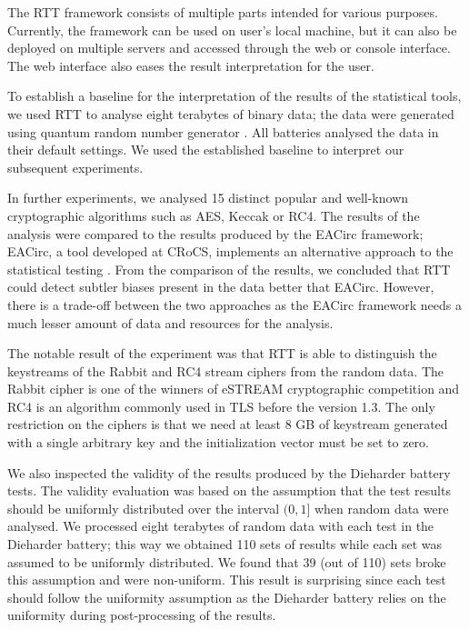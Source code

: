 \documentclass[
	digital,    %
	oneside,
	color,
	11pt,
	nocover,
	notable,
	nolof,
	nolot,
]{fithesis3}
\theoremstyle{definition}
\theoremstyle{remark}
\begin{document}
The RTT framework consists of multiple parts intended for various purposes. Currently, the framework can be used on user's local machine, but it can also be deployed on multiple servers and accessed through the web or console interface. The web interface also eases the result interpretation for the user.

To establish a baseline for the interpretation of the results of the statistical tools, we used RTT to analyse eight terabytes of binary data; the data were generated using quantum random number generator \cite{qrng-service-germany}. All batteries analysed the data in their default settings. We used the established baseline to interpret our subsequent experiments. 

In further experiments, we analysed 15 distinct popular and well-known cryptographic algorithms such as AES, Keccak or RC4. The results of the analysis were compared to the results produced by the EACirc framework; EACirc, a tool developed at CRoCS, implements an alternative approach to the statistical testing \cite{eacirc-github}. From the comparison of the results, we concluded that RTT could detect subtler biases present in the data better that EACirc. However, there is a trade-off between the two approaches as the EACirc framework needs a much lesser amount of data and resources for the analysis. 

The notable result of the experiment was that RTT is able to distinguish the keystreams of the Rabbit \cite{rabbit} and RC4 \cite{rc4} stream ciphers from the random data. The Rabbit cipher is one of the winners of eSTREAM \cite{estream-competition} cryptographic competition and RC4 is an algorithm commonly used in TLS before the version 1.3. The only restriction on the ciphers is that we need at least 8 GB of keystream generated with a single arbitrary key and the initialization vector must be set to zero.

We also inspected the validity of the results produced by the Dieharder battery tests. The validity evaluation was based on the assumption that the test results should be uniformly distributed over the interval $(0,1]$ when random data were analysed. We processed eight terabytes of random data with each test in the Dieharder battery; this way we obtained 110 sets of results while each set was assumed to be uniformly distributed. We found that 39 (out of 110) sets broke this assumption and were non-uniform. This result is surprising since each test should follow the uniformity assumption as the Dieharder battery relies on the uniformity during post-processing of the results.
\end{document}
